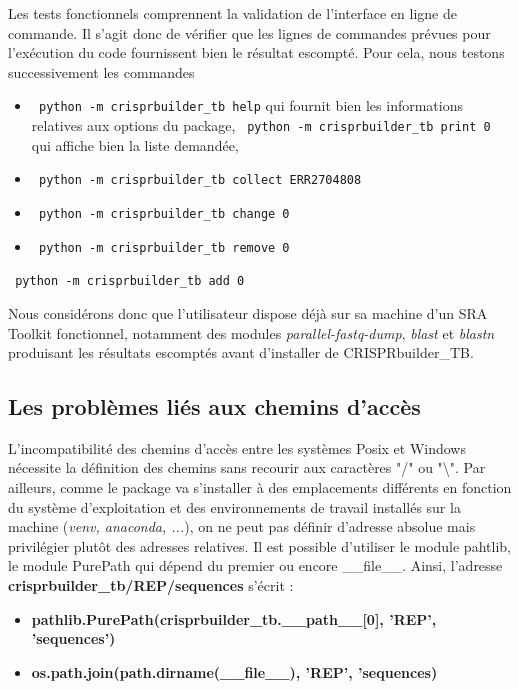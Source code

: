 \documentclass[twoside,a4paper,11pt,frenchb,openany]{report}
\begin{document}
Les tests fonctionnels comprennent la validation de l'interface en ligne de commande. Il s'agit donc de vérifier que les lignes de commandes prévues pour l'exécution du code fournissent bien le résultat escompté. Pour cela, nous testons successivement les commandes

\begin{itemize}
\item \texttt{  python -m crisprbuilder\_tb \textemdash \textemdash help} qui fournit bien les informations relatives aux options du package,
\texttt{  python -m crisprbuilder\_tb \textemdash \textemdash print 0} qui affiche bien la liste demandée,
\item \texttt{  python -m crisprbuilder\_tb \textemdash \textemdash collect ERR2704808}
\item \texttt{  python -m crisprbuilder\_tb \textemdash \textemdash change 0}
\item \texttt{  python -m crisprbuilder\_tb \textemdash \textemdash remove 0}
\end{itemize}
\texttt{  python -m crisprbuilder\_tb \textemdash \textemdash add 0}


Nous considérons donc que l'utilisateur dispose déjà sur sa machine d'un SRA Toolkit fonctionnel, notamment des modules \textit{parallel-fastq-dump}, \textit{blast} et \textit{blastn} produisant les résultats escomptés avant d'installer de CRISPRbuilder\_TB.

\subsection{Les problèmes liés aux chemins d'accès}

L'incompatibilité des chemins d'accès entre les systèmes Posix et Windows nécessite la définition des chemins sans recourir aux caractères "/" ou "\textbackslash". Par ailleurs, comme le package va s'installer à des emplacements différents en fonction du système d'exploitation et des environnements de travail installés sur la machine (\textit{venv, anaconda, ...}), on ne peut pas définir d'adresse absolue mais privilégier plutôt des adresses relatives. Il est possible d'utiliser le module pahtlib, le module PurePath qui dépend du premier ou encore \_\_file\_\_. Ainsi, l'adresse  \textbf{crisprbuilder\_tb/REP/sequences} s'écrit :
\begin{itemize}
\item \textbf{pathlib.PurePath(crisprbuilder\_tb.\_\_path\_\_[0], 'REP', 'sequences')}
\item \textbf{os.path.join(path.dirname(\_\_file\_\_), 'REP', 'sequences)}
\end{itemize}
\end{document}

